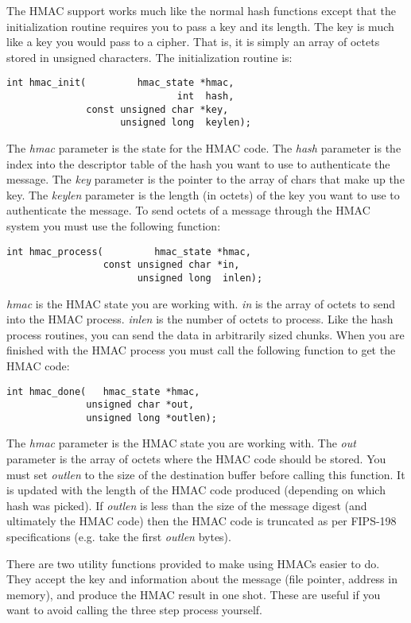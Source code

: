 \documentclass[synpaper]{book}
\begin{document}
The HMAC support works much like the normal hash functions except that the initialization routine requires you to pass a key 
and its length.  The key is much like a key you would pass to a cipher.  That is, it is simply an array of octets stored in
unsigned characters.  The initialization routine is:
\begin{verbatim}
int hmac_init(         hmac_state *hmac, 
                              int  hash, 
              const unsigned char *key, 
                    unsigned long  keylen);
\end{verbatim}
The \textit{hmac} parameter is the state for the HMAC code.  The \textit{hash} parameter is the index into the descriptor table of the hash you want
to use to authenticate the message.  The \textit{key} parameter is the pointer to the array of chars that make up the key.  The \textit{keylen} parameter is the
length (in octets) of the key you want to use to authenticate the message.  To send octets of a message through the HMAC system you must use the following function:
\begin{verbatim}
int hmac_process(         hmac_state *hmac, 
                 const unsigned char *in, 
                       unsigned long  inlen);
\end{verbatim}
\textit{hmac} is the HMAC state you are working with. \textit{in} is the array of octets to send into the HMAC process.  \textit{inlen} is the
number of octets to process.  Like the hash process routines, you can send the data in arbitrarily sized chunks. When you 
are finished with the HMAC process you must call the following function to get the HMAC code:
\begin{verbatim}
int hmac_done(   hmac_state *hmac, 
              unsigned char *out, 
              unsigned long *outlen);
\end{verbatim}
The \textit{hmac} parameter is the HMAC state you are working with.  The \textit{out} parameter is the array of octets where the HMAC code should be stored.  
You must set \textit{outlen} to the size of the destination buffer before calling this function.  It is updated with the length of the HMAC code
produced (depending on which hash was picked).  If \textit{outlen} is less than the size of the message digest (and ultimately
the HMAC code) then the HMAC code is truncated as per FIPS-198 specifications (e.g. take the first \textit{outlen} bytes).

There are two utility functions provided to make using HMACs easier to do.  They accept the key and information about the
message (file pointer, address in memory), and produce the HMAC result in one shot.  These are useful if you want to avoid
calling the three step process yourself.
\end{document}
